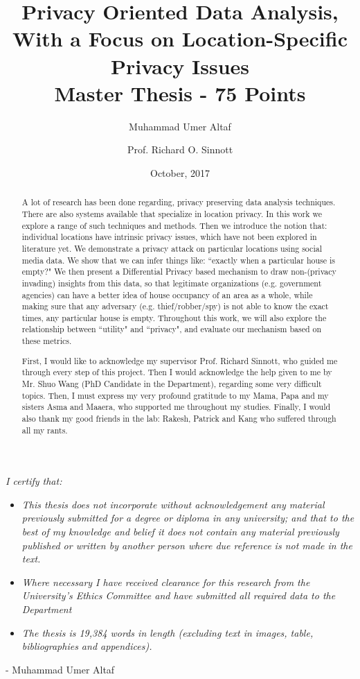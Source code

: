 \documentclass[12pt]{report}
\title{Privacy Oriented Data Analysis,\\With a Focus on Location-Specific Privacy Issues\\\large{Master Thesis - 75 Points}}
\author[]{Muhammad Umer Altaf}
\author[]{Prof. Richard O. Sinnott}
\affil[]{School of Computing and Information Systems,}
\affil[]{The University of Melbourne}
\date{October, 2017}
\theoremstyle{named}
\begin{document}
\maketitle

\begin{abstract}
   A lot of research has been done regarding, privacy preserving data analysis techniques. There are also systems available that specialize in location privacy. In this work we explore a range of such techniques and methods.  Then we introduce the notion that: individual locations have intrinsic privacy issues, which have not been explored in literature yet. We demonstrate a privacy attack on particular locations using social media data. We show that we can infer things like: ``exactly when a particular house is empty?" We then present a Differential Privacy based mechanism to draw non-(privacy invading) insights from this data, so that legitimate organizations (e.g. government agencies) can have a better idea of house occupancy of an area as a whole, while making sure that any adversary (e.g. thief/robber/spy) is not able to know the exact times, any particular house is empty. Throughout this work, we will also explore the relationship between ``utility" and ``privacy", and evaluate our mechanism based on these metrics. 
\end{abstract}
\renewcommand{\abstractname}{Acknowledgements}
\begin{abstract}
 First, I would like to acknowledge my supervisor Prof. Richard Sinnott, who guided me through every step of this project. Then I would acknowledge the help given to me by Mr. Shuo Wang (PhD Candidate in the Department), regarding some very difficult topics.
 Then, I must express my very profound gratitude to my Mama, Papa and my sisters Asma and Maaera, who supported me throughout my studies.
 Finally, I would also thank my good friends in the lab: Rakesh, Patrick and Kang who suffered through all my rants.
\end{abstract}

\setcounter{tocdepth}{1}
\tableofcontents
\pagebreak




\textit{I certify that:}
\begin{itemize}
\item \textit{This thesis does not incorporate without acknowledgement any material previously submitted for a degree or diploma in any university; and that to the best of my knowledge and belief it does not contain any material
previously published or written by another person where due reference is not made in the text.}
\item \textit{Where necessary I have received clearance for this research from the University's Ethics Committee and have submitted all required data to the Department }
\item \textit{The thesis is 19,384 words in length (excluding text in images, table, bibliographies and appendices).}
\end{itemize}
- Muhammad Umer Altaf
\pagebreak
\thispagestyle{empty}
 
\end{document}
